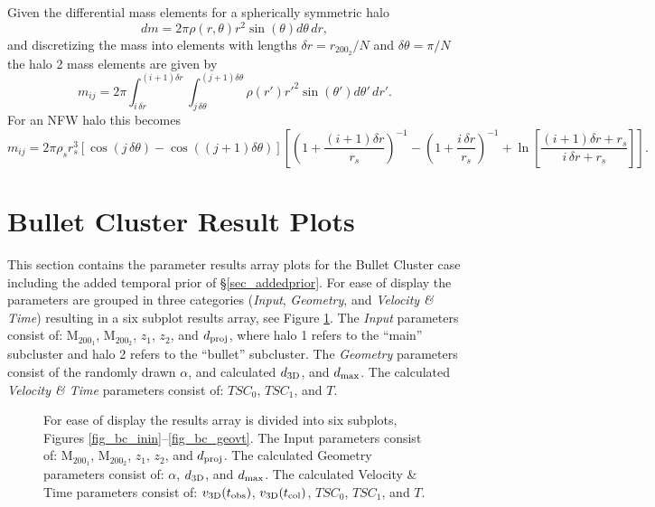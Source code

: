 \documentclass[12pt]{emulateapj}
\begin{document}
Given the differential mass elements for a spherically symmetric halo
\begin{displaymath}
dm = 2\pi\rho(r,\theta) r^2 \sin(\theta) d\theta\,dr,
\end{displaymath}
and discretizing the mass into elements with lengths $\delta r = r_{200_2}/N$ and $\delta\theta = \pi/N$ the halo 2 mass elements are given by
\begin{displaymath}
m_{ij} = 2\pi \int_{i\,\delta r}^{(i+1)\delta r} \int_{j\,\delta\theta}^{(j+1)\delta\theta} \rho(r') r'^2 \sin(\theta') d\theta'\,dr'.
\end{displaymath}
For an NFW halo this becomes
\begin{displaymath}
m_{ij} = 2\pi\rho_s r_s^3 \left[\cos(j\,\delta\theta)-\cos\left((j+1)\delta\theta\right) \right] \left[ \left( 1+\frac{(i+1)\delta r}{r_s}\right)^{-1} - \left(1+\frac{i\,\delta r}{r_s}\right)^{-1} + \ln\left[\frac{(i+1)\delta r+r_s}{i\,\delta r+r_s}\right]\right].
\end{displaymath}

\clearpage

\section{Bullet Cluster Result Plots}\label{sec_bcresults}

This section contains the parameter results array plots for the Bullet Cluster case including the added temporal prior of \S\ref{sec_addedprior}.
For ease of display the parameters are grouped in three categories (\emph{Input}, \emph{Geometry}, and \emph{Velocity \& Time}) resulting in a six subplot results array, see Figure \ref{fig_resultsarray}.
The \emph{Input} parameters consist of: M$_{200_1}$, M$_{200_2}$, $z_1$, $z_2$,	and $d_{\rm proj}$, where halo 1 refers to the ``main'' subcluster and halo 2 refers to the ``bullet'' subcluster.
The \emph{Geometry} parameters consist of the randomly drawn $\alpha$, and calculated $d_{\rm 3D}$, and $d_{\rm max}$.
The calculated \emph{Velocity \& Time} parameters consist of:  $TSC_0$, $TSC_1$, and $T$.

\begin{figure}[b]
\caption{
For ease of display the results array is divided into six subplots, Figures \ref{fig_bc_inin}--\ref{fig_bc_geovt}.
The Input parameters consist of: M$_{200_1}$, M$_{200_2}$, $z_1$, $z_2$,	and $d_{\rm proj}$.
The calculated Geometry parameters consist of: $\alpha$, $d_{\rm 3D}$, and $d_{\rm max}$.
The calculated Velocity \& Time parameters consist of:  $v_{\rm 3D}(t_{\rm obs})$, $v_{\rm 3D}(t_{\rm col})$, $TSC_0$, $TSC_1$, and $T$.
\label{fig_resultsarray}}
\end{figure}
\clearpage
\end{document}
